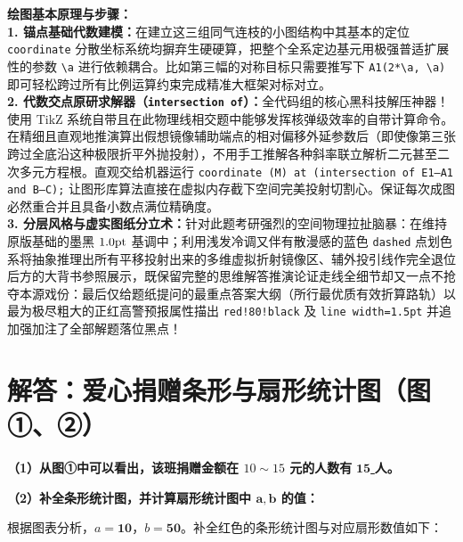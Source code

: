 \documentclass[12pt, a4paper]{ctexrep}
\begin{document}
{\small\color{blue!70!black}
\textbf{绘图基本原理与步骤：}\\
\textbf{1. 锚点基础代数建模：}在建立这三组同气连枝的小图结构中其基本的定位 \texttt{coordinate} 分散坐标系统均摒弃生硬硬算，把整个全系定边基元用极强普适扩展性的参数 \texttt{\textbackslash a} 进行依赖耦合。比如第三幅的对称目标只需要推写下 \texttt{A1(2*\textbackslash a, \textbackslash a)} 即可轻松跨过所有比例运算约束完成精准大框架对标对立。\\
\textbf{2. 代数交点原研求解器（\texttt{intersection of}）：}全代码组的核心黑科技解压神器！使用 TikZ 系统自带且在此物理线相交题中能够发挥核弹级效率的自带计算命令。在精细且直观地推演算出假想镜像辅助端点的相对偏移外延参数后（即使像第三张跨过全底沿这种极限折平外抛投射），不用手工推解各种斜率联立解析二元甚至二次多元方程根。直观交给机器运行 \texttt{coordinate (M) at (intersection of E1--A1 and B--C);} 让图形库算法直接在虚拟内存截下空间完美投射切割心。保证每次成图必然重合并且具备小数点满位精确度。\\
\textbf{3. 分层风格与虚实图纸分立术：}针对此题考研强烈的空间物理拉扯脑暴：在维持原版基础的墨黑 $1.0\rm{pt}$ 基调中；利用浅发冷调又伴有散漫感的蓝色 \texttt{dashed} 点划色系将抽象推理出所有平移投射出来的多维虚拟折射镜像区、辅外投引线作完全退位后方的大背书参照展示，既保留完整的思维解答推演论证走线全细节却又一点不抢夺本源戏份：最后仅给题纸提问的最重点答案大纲（所行最优质有效折算路轨）以最为极尽粗大的正红高警预报属性描出 \texttt{red!80!black} 及 \texttt{line width=1.5pt} 并追加强加注了全部解题落位黑点！
}

\newpage

\section{解答：爱心捐赠条形与扇形统计图（图①、②）}

\vspace{0.6cm}

\textbf{（1）从图①中可以看出，该班捐赠金额在 $10\sim 15$ 元的人数有} \underline{\quad $\textbf{15}$ \quad} \textbf{人。}

\vspace{0.4cm}

\textbf{（2）补全条形统计图，并计算扇形统计图中 $\boldsymbol{a}, \boldsymbol{b}$ 的值：}

根据图表分析，$a = \boldsymbol{10}$，$b = \boldsymbol{50}$。补全红色的条形统计图与对应扇形数值如下：
\end{document}
